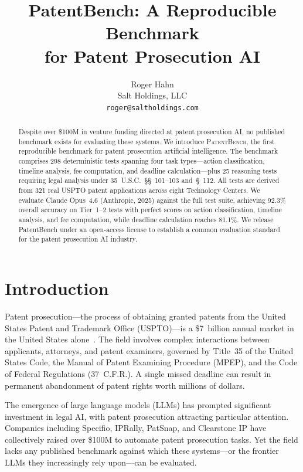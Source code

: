 \documentclass[11pt]{article}
\title{\textbf{PatentBench: A Reproducible Benchmark\\for Patent Prosecution AI}}
\author{
    Roger Hahn\\
    Salt Holdings, LLC\\
    \texttt{roger@saltholdings.com}
}
\date{}
\begin{document}
\maketitle

\begin{abstract}
Despite over \$100M in venture funding directed at patent prosecution AI, no published benchmark exists for evaluating these systems. We introduce \textsc{PatentBench}, the first reproducible benchmark for patent prosecution artificial intelligence. The benchmark comprises 298 deterministic tests spanning four task types---action classification, timeline analysis, fee computation, and deadline calculation---plus 25 reasoning tests requiring legal analysis under 35~U.S.C.~\S\S~101--103 and~\S~112. All tests are derived from 321 real USPTO patent applications across eight Technology Centers. We evaluate Claude Opus~4.6 (Anthropic, 2025) against the full test suite, achieving 92.3\% overall accuracy on Tier~1--2 tests with perfect scores on action classification, timeline analysis, and fee computation, while deadline calculation reaches 81.1\%. We release PatentBench under an open-access license to establish a common evaluation standard for the patent prosecution AI industry.
\end{abstract}

\section{Introduction}
\label{sec:introduction}

Patent prosecution---the process of obtaining granted patents from the United States Patent and Trademark Office (USPTO)---is a \$7~billion annual market in the United States alone~\citep{aipla2023}. The field involves complex interactions between applicants, attorneys, and patent examiners, governed by Title~35 of the United States Code, the Manual of Patent Examining Procedure (MPEP), and the Code of Federal Regulations (37~C.F.R.). A single missed deadline can result in permanent abandonment of patent rights worth millions of dollars.

The emergence of large language models (LLMs) has prompted significant investment in legal AI, with patent prosecution attracting particular attention. Companies including Specifio, IPRally, PatSnap, and Clearstone IP have collectively raised over \$100M to automate patent prosecution tasks. Yet the field lacks any published benchmark against which these systems---or the frontier LLMs they increasingly rely upon---can be evaluated.
\end{document}

